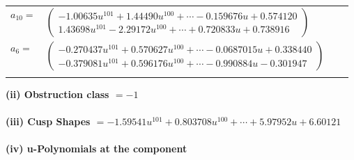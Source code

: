 \documentclass[1p]{elsarticle_modified}
\theoremstyle{definition}
\begin{document}
\begin{tabular}{m{7pt} m{180pt} m{7pt} m{180pt} }
\flushright $a_{10}=$&$\begin{pmatrix}-1.00635 u^{101}+1.44490 u^{100}+\cdots-0.159676 u+0.574120\\1.43698 u^{101}-2.29172 u^{100}+\cdots+0.720833 u+0.738916\end{pmatrix}$ \\
\flushright $a_{6}=$&$\begin{pmatrix}-0.270437 u^{101}+0.570627 u^{100}+\cdots-0.0687015 u+0.338440\\-0.379081 u^{101}+0.596176 u^{100}+\cdots-0.990884 u-0.301947\end{pmatrix}$\\&\end{tabular}
\flushleft \textbf{(ii) Obstruction class $= -1$}\\~\\
\flushleft \textbf{(iii) Cusp Shapes $= -1.59541 u^{101}+0.803708 u^{100}+\cdots+5.97952 u+6.60121$}\\~\\
\newpage\renewcommand{\arraystretch}{1}
\flushleft \textbf{(iv) u-Polynomials at the component}\newline \\
\end{document}
